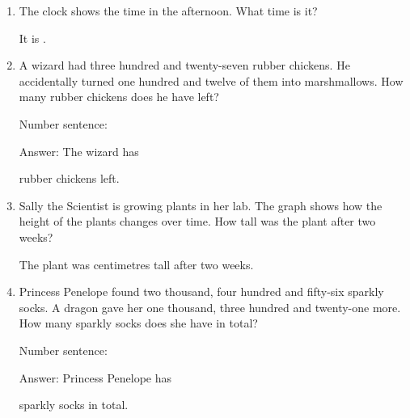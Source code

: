 \documentclass{tufte-book}
\begin{document}
\begin{enumerate}

\item {}
The clock shows the time in the afternoon. What time is it?\medskip

It is \dotfill\medskip.

\item
  A wizard had three hundred and twenty-seven rubber chickens. He
  accidentally turned one hundred and twelve of them into marshmallows.
  How many rubber chickens does he have left?\medskip

  Number sentence:
  \dotfill\medskip\par
  Answer: The wizard has
  \dotfill\medskip\par\mbox{}\dotfill\medskip\par\mbox{}\dotfill\bigskip
  rubber chickens left.

\item {}
  Sally the Scientist is growing plants in her lab.
  The graph shows how the height of the plants changes over time.
  How tall was the plant after two weeks?\medskip

  The plant was \dotfill\medskip
  centimetres tall after two weeks.

\item
  Princess Penelope found two thousand, four hundred and fifty-six
  sparkly socks. A dragon gave her one thousand, three hundred and
  twenty-one more. How many sparkly socks does she have in total?\medskip\par
  Number sentence:
  \dotfill\medskip\par
  Answer: Princess Penelope has
  \dotfill\medskip\par\mbox{}\dotfill\medskip\par\mbox{}\dotfill\bigskip
  sparkly socks in total.

\end{enumerate}
\end{document}
